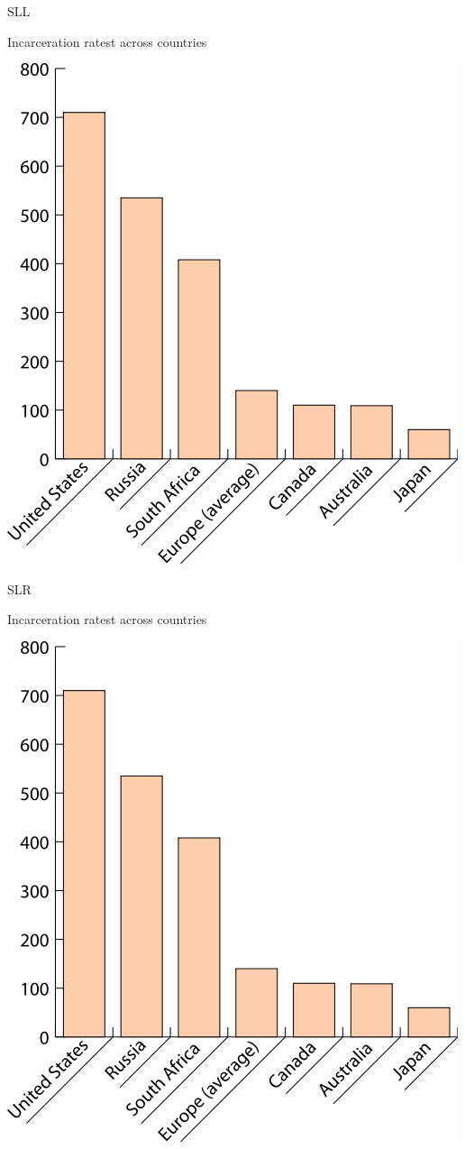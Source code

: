 \documentclass[print,Draft]{faosyb}
\begin{document}
\begin{chart}{S}{LL}
\caption{Incarceration ratest across countries}
\label{chart:incarceration}
\includegraphics[width=\chartwidth,height=\chartheight]{incarceration}  
\end{chart}

\begin{chart}{S}{LR}
\caption{Incarceration ratest across countries}
\label{chart:incarceration}
\includegraphics[width=\chartwidth,height=\chartheight]{incarceration}  
\end{chart}
\end{document}
